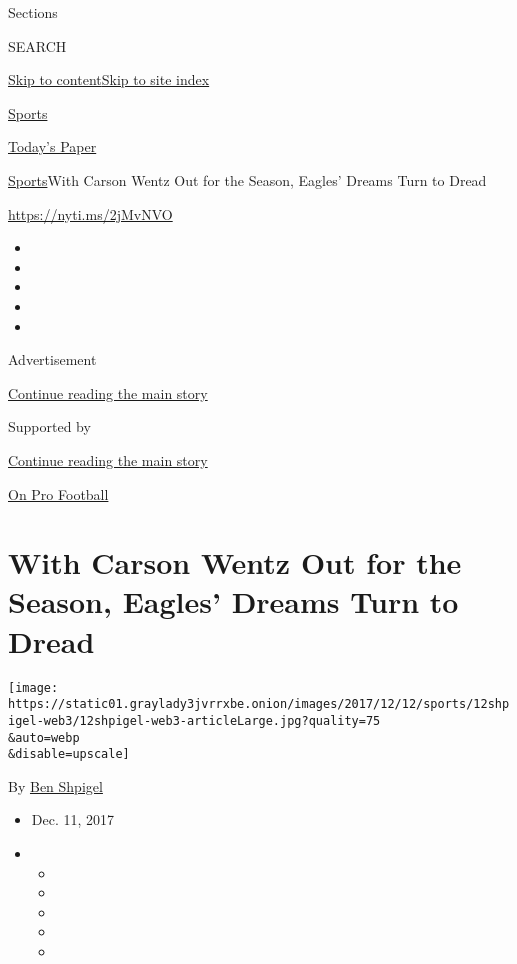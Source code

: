 Sections

SEARCH

\protect\hyperlink{site-content}{Skip to
content}\protect\hyperlink{site-index}{Skip to site index}

\href{https://www.nytimes3xbfgragh.onion/section/sports}{Sports}

\href{https://myaccount.nytimes3xbfgragh.onion/auth/login?response_type=cookie\&client_id=vi}{}

\href{https://www.nytimes3xbfgragh.onion/section/todayspaper}{Today's
Paper}

\href{/section/sports}{Sports}\textbar{}With Carson Wentz Out for the
Season, Eagles' Dreams Turn to Dread

\url{https://nyti.ms/2jMvNVO}

\begin{itemize}
\item
\item
\item
\item
\item
\end{itemize}

Advertisement

\protect\hyperlink{after-top}{Continue reading the main story}

Supported by

\protect\hyperlink{after-sponsor}{Continue reading the main story}

\href{/column/on-pro-football}{On Pro Football}

\hypertarget{with-carson-wentz-out-for-the-season-eagles-dreams-turn-to-dread}{%
\section{With Carson Wentz Out for the Season, Eagles' Dreams Turn to
Dread}\label{with-carson-wentz-out-for-the-season-eagles-dreams-turn-to-dread}}

\texttt{[image: https://static01.graylady3jvrrxbe.onion/images/2017/12/12/sports/12shpigel-web3/12shpigel-web3-articleLarge.jpg?quality=75\\\&auto=webp\\\&disable=upscale]}

By \href{http://www.nytimes3xbfgragh.onion/by/ben-shpigel}{Ben Shpigel}

\begin{itemize}
\item
  Dec. 11, 2017
\item
  \begin{itemize}
  \item
  \item
  \item
  \item
  \item
  \end{itemize}
\end{itemize}

